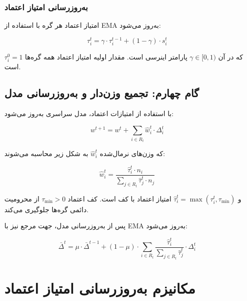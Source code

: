 \subsubsection{به‌روزرسانی امتیاز اعتماد}

امتیاز اعتماد هر گره با استفاده از \gls{EMA} به‌روز می‌شود:

\begin{equation}
    \tau_i^t = \gamma \cdot \tau_i^{t-1} + (1 - \gamma) \cdot s_i^t
    \label{eq:trust_update}
\end{equation}

که در آن $\gamma \in [0, 1)$ پارامتر اینرسی است. مقدار اولیه امتیاز اعتماد همه گره‌ها $\tau_i^0 = 1$ است.

\subsection{گام چهارم: تجمیع وزن‌دار و به‌روزرسانی مدل}

با استفاده از امتیازات اعتماد، مدل سراسری به‌روز می‌شود:

\begin{equation}
    w^{t+1} = w^t + \sum_{i \in R_t} \hat{w}_i^t \cdot \Delta_i^t
    \label{eq:aggregation}
\end{equation}

که وزن‌های نرمال‌شده $\hat{w}_i^t$ به شکل زیر محاسبه می‌شوند:

\begin{equation}
    \hat{w}_i^t = \frac{\hat{\tau}_i^t \cdot n_i}{\sum_{j \in R_t} \hat{\tau}_j^t \cdot n_j}
    \label{eq:weights}
\end{equation}

و $\hat{\tau}_i^t = \max(\tau_i^t, \tau_{\min})$ امتیاز اعتماد با کف است. کف اعتماد $\tau_{\min} > 0$ از محرومیت دائمی گره‌ها جلوگیری می‌کند.

پس از به‌روزرسانی مدل، جهت مرجع نیز با \gls{EMA} به‌روز می‌شود:

\begin{equation}
    \bar{\Delta}^t = \mu \cdot \bar{\Delta}^{t-1} + (1 - \mu) \cdot \sum_{i \in R_t} \frac{\hat{\tau}_i^t}{\sum_{j \in R_t} \hat{\tau}_j^t} \cdot \Delta_i^t
    \label{eq:reference_update}
\end{equation}


\section{مکانیزم به‌روزرسانی امتیاز اعتماد}
\label{sec:trust_update}

